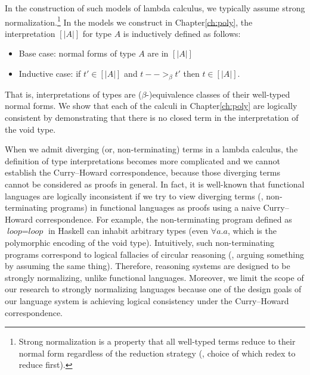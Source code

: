 In the construction of such models of lambda calculus, we typically assume
strong normalization.\footnote{
	Strong normalization is a property that
	all well-typed terms reduce to their normal form regardless of
	the reduction strategy (\ie, choice of which redex to reduce first).}
	In the models we construct in Chapter\;\ref{ch:poly},
the interpretation $[| A |]$ for type $A$ is inductively defined as follows:
\begin{itemize}
        \item Base case: normal forms of type $A$ are in $[| A |]$
        \item Inductive case: if $t' \in [| A |]$ and $t -->_\beta t'$
                then $t \in [| A |]$.
\end{itemize}
That is, interpretations of types are ($\beta$-)equivalence classes of their
well-typed normal forms.
We show that each of the calculi in Chapter\;\ref{ch:poly} are
logically consistent by demonstrating that there is no closed term
in the interpretation of the void type.

When we admit diverging (or, non-terminating) terms in a lambda calculus,
the definition of type interpretations becomes more complicated and
we cannot establish the Curry--Howard correspondence, because those
diverging terms cannot be considered as proofs in general. In fact,
it is well-known that functional languages are logically inconsistent
if we try to view diverging terms (\ie, non-terminating programs)
in functional languages as proofs using a naive Curry--Howard correspondence.
For example, the non-terminating program defined as
$\textit{loop} = \textit{loop}$ in Haskell can inhabit arbitrary types
(even $\forall a.a$, which is the polymorphic encoding of the void type).
Intuitively, such non-terminating programs correspond to logical fallacies of
circular reasoning (\ie, arguing something by assuming the same thing).
Therefore, reasoning systems are designed to be strongly normalizing,
unlike functional languages. Moreover, we limit the scope of our research to
strongly normalizing languages because one of the design goals of our language
system is achieving logical consistency under the Curry--Howard correspondence.


